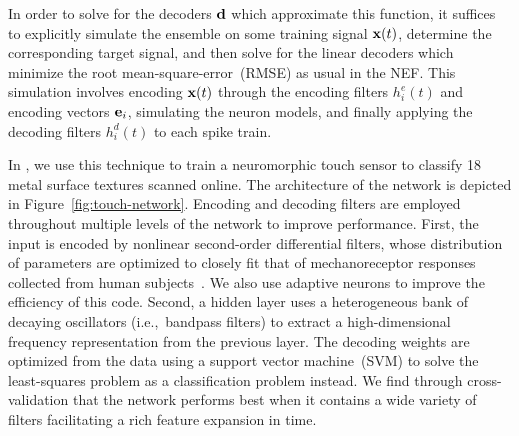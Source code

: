 
In order to solve for the decoders $\mathbf{d}$ which approximate this function, it suffices to explicitly simulate the ensemble on some training signal $\mathbf{x}(t)$, determine the corresponding target signal, and then solve for the linear decoders which minimize the root mean-square-error~(RMSE) as usual in the NEF.
This simulation involves encoding $\mathbf{x}(t)$ through the encoding filters $h_i^e(t)$ and encoding vectors $\mathbf{e}_i$, simulating the neuron models, and finally applying the decoding filters $h_i^d(t)$ to each spike train.

In \citet{voelker2016a}, we use this technique to train a neuromorphic touch sensor to classify 18 metal surface textures scanned online.
The architecture of the network is depicted in Figure~\ref{fig:touch-network}.
Encoding and decoding filters are employed throughout multiple levels of the network to improve performance.
First, the input is encoded by nonlinear second-order differential filters, whose distribution of parameters are optimized to closely fit that of mechanoreceptor responses collected from human subjects~\citep{kim2010predicting}.
We also use adaptive neurons to improve the efficiency of this code.
Second, a hidden layer uses a heterogeneous bank of decaying oscillators (i.e.,~bandpass filters) to extract a high-dimensional frequency representation from the previous layer.
The decoding weights are optimized from the data using a support vector machine~(SVM) to solve the least-squares problem as a classification problem instead.
We find through cross-validation that the network performs best when it contains a wide variety of filters facilitating a rich feature expansion in time.


